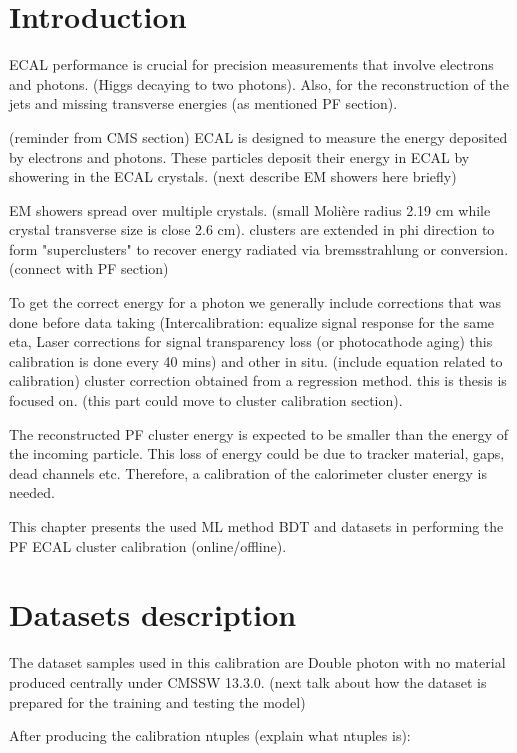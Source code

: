 
\section{Introduction}

ECAL performance is crucial for precision measurements that involve electrons and photons. 
(Higgs decaying to two photons). Also, for the reconstruction of the jets and missing transverse energies (as mentioned PF section).

(reminder from CMS section) ECAL is designed to measure the energy deposited by electrons and photons. These particles deposit their energy in ECAL by showering in the ECAL crystals. (next describe EM showers here briefly)

EM showers spread over multiple crystals. (small Molière radius 2.19 cm while crystal transverse size is close 2.6 cm). clusters are extended in phi direction to form "superclusters" to recover energy radiated via bremsstrahlung or conversion. (connect with PF section)

To get the correct energy for a photon we generally include corrections that was done before data taking (Intercalibration: equalize signal response for the same eta, Laser corrections for signal transparency loss (or photocathode aging) this calibration is done every 40 mins) and other in situ. (include equation related to calibration) cluster correction obtained from a regression method. this is thesis is focused on. (this part could move to cluster calibration section).

The reconstructed PF cluster energy is expected to be smaller than the energy of the incoming particle. This loss of energy could be due to tracker material, gaps, dead channels etc. Therefore, a calibration of the calorimeter cluster energy is needed.

This chapter presents the used ML method BDT and datasets in performing the PF ECAL cluster calibration (online/offline).  


\section{Datasets description}

The dataset samples used in this calibration are Double photon with no material produced centrally under CMSSW 13.3.0. (next talk about how the dataset is prepared for the training and testing the model) 

After producing the calibration ntuples (explain what ntuples is):

